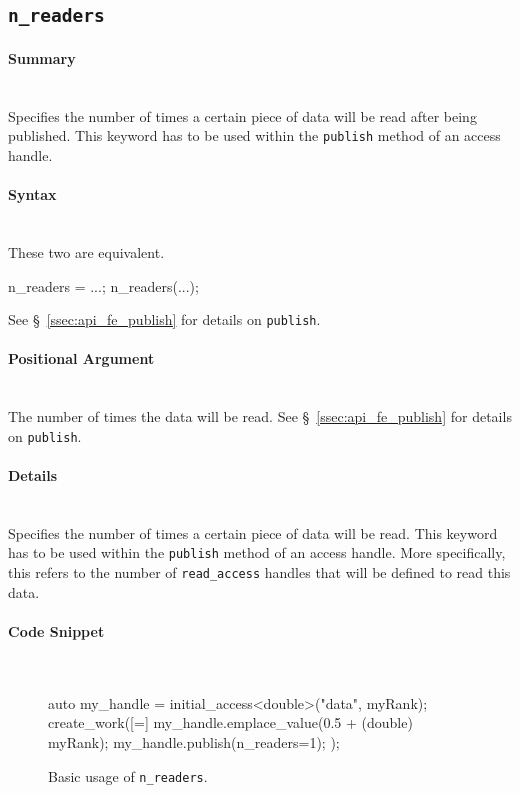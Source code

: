 \subsection{\texttt{n\_readers}}

\paragraph{Summary}\mbox{}\\ 
Specifies the number of times a certain piece of 
data will be read after being published. This keyword has to be used within 
the \texttt{publish} method of an access handle.


\paragraph{Syntax}\mbox{}\\ 
These two are equivalent.
\begin{CppCode}
n_readers = ...; 
n_readers(...); 
\end{CppCode}
See \S~\ref{ssec:api_fe_publish} for details on \texttt{publish}.


\paragraph{Positional Argument}\mbox{}\\ 
The number of times the data will be read.
See \S~\ref{ssec:api_fe_publish} for details on \texttt{publish}.


\paragraph{Details}\mbox{}\\ 
Specifies the number of times a certain piece of 
data will be read. This keyword has to be used within 
the \texttt{publish} method of an access handle.
More specifically, this refers to the number of \texttt{read\_access} 
handles that will be defined to read this data.


\paragraph{Code Snippet}\mbox{}\\ 
\begin{figure}[!h]
\begin{CppCodeNumb}
auto my_handle = initial_access<double>("data", myRank);
create_work([=]
{
  my_handle.emplace_value(0.5 + (double) myRank);
  my_handle.publish(n_readers=1);
});
\end{CppCodeNumb}
\label{fig:fe_api_n_readers}
\caption{Basic usage of \texttt{n\_readers}.}
\end{figure}




